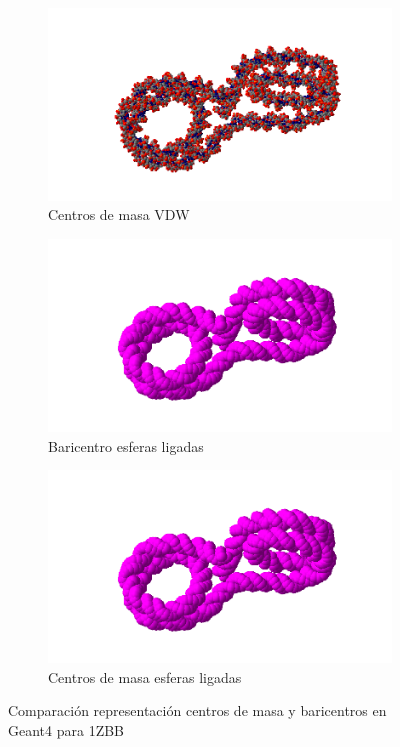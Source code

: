 \begin{figure}
\begin{subfigure}{.4\textwidth}
  \centering
  \includegraphics[width=.78\linewidth]{./Figures/bavdw.png}
  \caption{Centros de masa VDW}
  \label{fig:sub44}
\end{subfigure}
\begin{subfigure}{.4\textwidth}
  \centering
  \includegraphics[width=.78\linewidth]{./Figures/a.png}
  \caption{Baricentro esferas ligadas}
  \label{fig:sub55}
\end{subfigure}%
\begin{subfigure}{.4\textwidth}
  \centering
  \includegraphics[width=.78\linewidth]{./Figures/a.png}
  \caption{Centros de masa esferas ligadas}
  \label{fig:sub66}
\end{subfigure}
\caption[Comparación de centros de masa y baricentros en Geant4 1ZBB]{Comparación representación centros de masa y baricentros en Geant4 para 1ZBB}
\label{h}
\end{figure}




